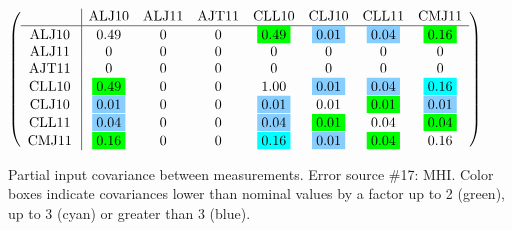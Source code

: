 \begin{table}[H]
\scriptsize
\begin{center}
\renewcommand{\arraystretch}{1.1}
\begin{math}\left(\begin{array}{c|ccccccc}
 & \mathrm{ALJ10} & 
\mathrm{ALJ11} & 
\mathrm{AJT11} & 
\mathrm{CLL10} & 
\mathrm{CLJ10} & 
\mathrm{CLL11} & 
\mathrm{CMJ11} \\
\hline
\mathrm{ALJ10} \hspace*{2pt} &       0.49 &  0 &  0 &  \colorbox{Green1}{$      0.49$} &  \colorbox{SkyBlue1}{$      0.01$} &  \colorbox{SkyBlue1}{$      0.04$} &  \colorbox{Green1}{$      0.16$} \\
\mathrm{ALJ11} \hspace*{2pt} &  0 &  0 &  0 &  0 &  0 &  0 &  0 \\
\mathrm{AJT11} \hspace*{2pt} &  0 &  0 &  0 &  0 &  0 &  0 &  0 \\
\mathrm{CLL10} \hspace*{2pt} &  \colorbox{Green1}{$      0.49$} &  0 &  0 &       1.00 &  \colorbox{SkyBlue1}{$      0.01$} &  \colorbox{SkyBlue1}{$      0.04$} &  \colorbox{Cyan1}{$      0.16$} \\
\mathrm{CLJ10} \hspace*{2pt} &  \colorbox{SkyBlue1}{$      0.01$} &  0 &  0 &  \colorbox{SkyBlue1}{$      0.01$} &       0.01 &  \colorbox{Green1}{$      0.01$} &  \colorbox{SkyBlue1}{$      0.01$} \\
\mathrm{CLL11} \hspace*{2pt} &  \colorbox{SkyBlue1}{$      0.04$} &  0 &  0 &  \colorbox{SkyBlue1}{$      0.04$} &  \colorbox{Green1}{$      0.01$} &       0.04 &  \colorbox{Green1}{$      0.04$} \\
\mathrm{CMJ11} \hspace*{2pt} &  \colorbox{Green1}{$      0.16$} &  0 &  0 &  \colorbox{Cyan1}{$      0.16$} &  \colorbox{SkyBlue1}{$      0.01$} &  \colorbox{Green1}{$      0.04$} &       0.16 \\
\end{array}\right)\end{math}
\caption{Partial input covariance between measurements. Error source \#17: MHI. Color boxes indicate covariances lower than nominal values by a factor up to 2 (green), up to 3 (cyan) or greater than 3 (blue).}
\renewcommand{\arraystretch}{1}
\end{center}
\end{table}
\clearpage
